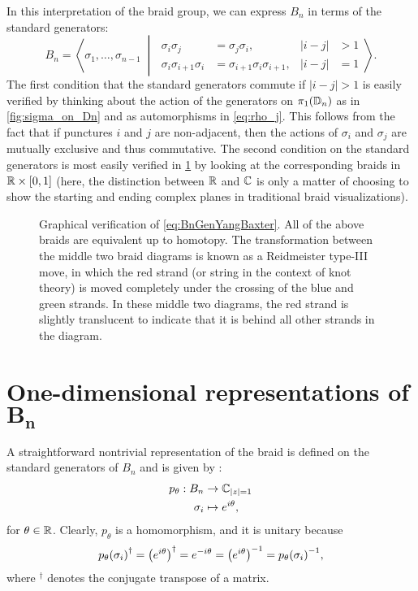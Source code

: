 In this interpretation of the braid group, we can express $B_n$ in terms of the standard generators:
\begin{equation}\label{eq:BnGenYangBaxter}
    B_n = \left\langle \sigma_1,\dots,\sigma_{n-1} \;\middle|\;
    \begin{aligned}
        \sigma_i\sigma_j &= \sigma_j\sigma_i, & |i-j|&>1 \\
        \sigma_i\sigma_{i+1}\sigma_i &= \sigma_{i+1}\sigma_i\sigma_{i+1}, & |i-j|&=1
    \end{aligned}
    \right\rangle.
\end{equation}
The first condition that the standard generators commute if $|i-j|>1$ is easily verified by thinking about the action of the generators on $\pi_1(\mathbb{D}_n)$ as in \cref{fig:sigma_on_Dn} and as automorphisms in \cref{eq:rho_j}. This follows from the fact that if punctures $i$ and $j$ are non-adjacent, then the actions of $\sigma_i$ and $\sigma_j$ are mutually exclusive and thus commutative. The second condition on the standard generators is most easily verified in \cref{fig:YB_criterion_verification} by looking at the corresponding braids in $\mathbb{R}\times[0,1]$ (here, the distinction between $\mathbb{R}$ and $\mathbb{C}$ is only a matter of choosing to show the starting and ending complex planes in traditional braid visualizations).
\begin{figure}[htbp]
    \centering
    
    \caption{Graphical verification of \cref{eq:BnGenYangBaxter}. All of the above braids are equivalent up to homotopy. The transformation between the middle two braid diagrams is known as a Reidmeister type-III move, in which the red strand (or string in the context of knot theory) is moved completely under the crossing of the blue and green strands. In these middle two diagrams, the red strand is slightly translucent to indicate that it is behind all other strands in the diagram.}\label{fig:YB_criterion_verification}
\end{figure}

\section[One-dimensional representations of $B_n$]{One-dimensional representations of $\mathbf{B_n}$}\label{sec:1D_rep}
A straightforward nontrivial representation of the braid is defined on the standard generators of $B_n$ and is given by \cite{Deshmukh}:
\begin{align}
    p_\theta: B_n&\to \mathbb{C}_{\left|z\right|=1} \\
    \sigma_i &\mapsto e^{i\theta},
\end{align}
for $\theta\in\mathbb{R}$. Clearly, $p_\theta$ is a homomorphism, and it is unitary because
\begin{equation}
    {p_\theta(\sigma_i)}^\dagger = {\left( e^{i\theta} \right)}^\dagger = e^{-i\theta} = { \left( e^{i\theta} \right) }^{-1} = { p_\theta(\sigma_i) }^{-1},
\end{equation}
where $^\dagger$ denotes the conjugate transpose of a matrix. 

